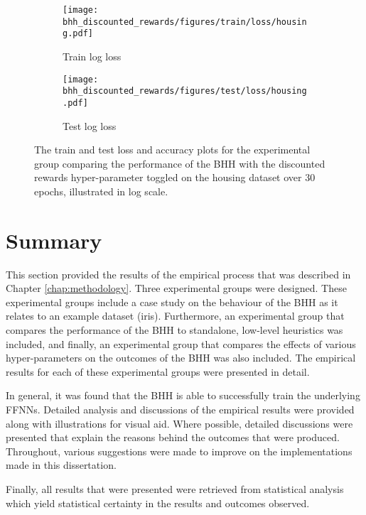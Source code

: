 \begin{figure}[htbp]
      \begin{subfigure}{0.5\textwidth}
            \centering
            \texttt{[image: bhh\_discounted\_rewards/figures/train/loss/housing.pdf]}
            \caption{Train log loss}
            \label{fig:results:discounted_rewards:figures:loss:train:housing}
      \end{subfigure}
      \begin{subfigure}{0.5\textwidth}
            \centering
            \texttt{[image: bhh\_discounted\_rewards/figures/test/loss/housing.pdf]}
            \caption{Test log loss}
            \label{fig:results:discounted_rewards:figures:loss:test:housing}
      \end{subfigure}
      \par\bigskip
      \caption{The train and test loss and accuracy plots for the experimental group comparing the performance of the \acs{BHH} with the discounted rewards hyper-parameter toggled on the housing dataset over 30 epochs, illustrated in log scale.}
      \label{fig:results:discounted_rewards:figures:housing}
\end{figure}

\section{Summary}\label{sec:results:summary}

This section provided the results of the empirical process that was described in Chapter \ref{chap:methodology}. Three experimental groups were designed. These experimental groups include a case study on the behaviour of the \acs{BHH} as it relates to an example dataset (iris). Furthermore, an experimental group that compares the performance of the \acs{BHH} to standalone, low-level heuristics was included, and finally, an experimental group that compares the effects of various hyper-parameters on the outcomes of the \acs{BHH} was also included. The empirical results for each of these experimental groups were presented in detail.

In general, it was found that the \acs{BHH} is able to successfully train the underlying \acp{FFNN}. Detailed analysis and discussions of the empirical results were provided along with illustrations for visual aid. Where possible, detailed discussions were presented that explain the reasons behind the outcomes that were produced. Throughout, various suggestions were made to improve on the implementations made in this dissertation.

Finally, all results that were presented were retrieved from statistical analysis which yield statistical certainty in the results and outcomes observed.